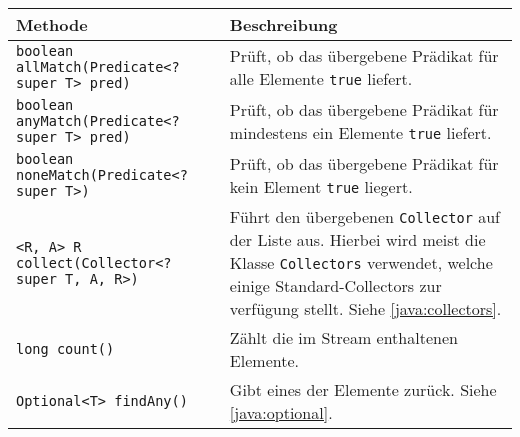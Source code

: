 \begin{sidewaystable}
	\centering
	\begin{tabular}{p{8cm} | p{13cm}}
		Methode                                                                                          & Beschreibung                                                                                                                                                                                                  \\
		\hline
		\texttt{boolean allMatch(Predicate<? super T> pred)}                                             & Prüft, ob das übergebene Prädikat für alle Elemente \texttt{true} liefert.                                                                                                                                    \\
		\texttt{boolean anyMatch(Predicate<? super T> pred)}                                             & Prüft, ob das übergebene Prädikat für mindestens ein Elemente \texttt{true} liefert.                                                                                                                          \\
		\texttt{boolean noneMatch(Predicate<? super T>)}                                                 & Prüft, ob das übergebene Prädikat für kein Element \texttt{true} liegert.                                                                                                                                     \\
		\texttt{<R, A> R collect(Collector<? super T, A, R>)}                                            & Führt den übergebenen \texttt{Collector} auf der Liste aus. Hierbei wird meist die Klasse \texttt{Collectors} verwendet, welche einige Standard-Collectors zur verfügung stellt. Siehe \ref{java:collectors}. \\
		\texttt{long count()}                                                                            & Zählt die im Stream enthaltenen Elemente.                                                                                                                                                                     \\
		\texttt{Optional<T> findAny()}                                                                   & Gibt eines der Elemente zurück. Siehe \ref{java:optional}.                                                                                                                                                    \\

\end{tabular}
\end{sidewaystable}

